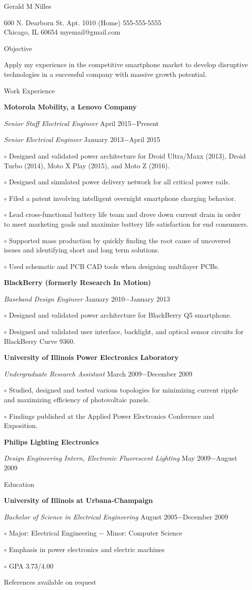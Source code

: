 \documentclass[12pt, letterpaper]{article}
\newcommand{\myname}[1]{{\begin{center} \LARGE #1 \end{center} \par }}
\newcommand{\myhead}[1]{{\vspace{2mm} \Large #1 \par}}
\newcommand{\objective}[1]{{\addtolength{\leftskip}{10mm} #1 \par }}
\newcommand{\company}[1]{{\vspace{1mm} \addtolength{\leftskip}{10mm} \textbf{#1} \par}}
\newcommand{\position}[2]{{\addtolength{\leftskip}{10mm} \emph{#1} \hfill #2 \par \vspace{1mm}}}
\newcommand{\skill}[1]{{  \vspace{0.3mm} \addtolength{\leftskip}{20mm} \setlength\parindent{-4mm} $\circ$ #1 \par}}
\begin{document}
\pagestyle{empty}
\raggedright

\myname{Gerald M Nilles}
600 N. Dearborn St. Apt. 1010 \hfill (Home) 555-555-5555 \\
Chicago, IL 60654   \hfill myemail@gmail.com \\
\myhead{Objective}
    \objective{Apply my experience in the competitive smartphone market to develop disruptive technologies in a successful company with massive growth potential.}

\myhead{Work Experience}
    \company{Motorola Mobility, a Lenovo Company}
    \position{Senior Staff Electrical Engineer}{April 2015$-$Present}
    \position{Senior Electrical Engineer}{January 2013$-$April 2015}
        \skill{Designed and validated power architecture for Droid Ultra/Maxx (2013), Droid Turbo (2014), Moto X Play (2015), and Moto Z (2016).}
        \skill{Designed and simulated power delivery network for all critical power rails.}
	\skill{Filed a patent involving intelligent overnight smartphone charging behavior.}
        \skill{Lead cross-functional battery life team and drove down current drain in order to meet marketing goals and maximize battery life satisfaction for end consumers.}
	\skill{Supported mass production by quickly finding the root cause of uncovered issues and identifying short and long term solutions.}
        \skill{Used schematic and PCB CAD tools when designing multilayer PCBs.}

    \company{BlackBerry (formerly Research In Motion)}
    \position{Baseband Design Engineer}{January 2010$-$January 2013}
        \skill{Designed and validated power architecture for BlackBerry Q5 smartphone.}
        \skill{Designed and validated user interface, backlight, and optical sensor circuits for BlackBerry Curve 9360.}

    \company{University of Illinois Power Electronics Laboratory}
    \position{Undergraduate Research Assistant}{March 2009$-$December 2009}
        \skill{Studied, designed and tested various topologies for minimizing current ripple and maximizing efficiency of photovoltaic panels.}
	\skill{Findings published at the Applied Power Electronics Conference and Exposition.}

    \company{Philips Lighting Electronics} 
    \position{Design Engineering Intern, Electronic Fluorescent Lighting}{May 2009$-$August 2009}

\myhead{Education}
    \company{University of Illinois at Urbana-Champaign}
    \position{Bachelor of Science in Electrical Engineering}{August 2005$-$December 2009}
        \skill{Major: Electrical Engineering $-$ Minor: Computer Science}
        \skill{Emphasis in power electronics and electric machines}
	\skill{GPA 3.73/4.00}

\begin{center}
\small
References available on request
\end{center}
\end{document}
